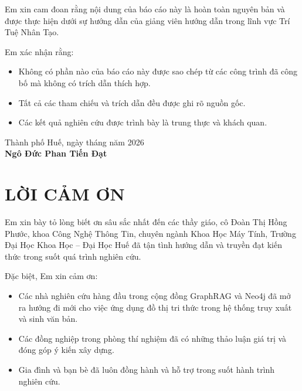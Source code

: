 \documentclass[12pt,a4paper]{report}
\theoremstyle{plain}
\theoremstyle{definition}
\begin{document}
	\vspace{1cm}
	
	Em xin cam đoan rằng nội dung của báo cáo này là hoàn toàn nguyên bản và được
	thực hiện dưới sự hướng dẫn của giảng viên hướng dẫn trong lĩnh vực Trí Tuệ Nhân Tạo.
	
	Em xác nhận rằng:
	\begin{itemize}
		\item Không có phần nào của báo cáo này được sao chép từ các công trình đã công
		bố mà không có trích dẫn thích hợp.
		\item Tất cả các tham chiếu và trích dẫn đều được ghi rõ nguồn gốc.
		\item Các kết quả nghiên cứu được trình bày là trung thực và khách quan.
	\end{itemize}
	
	\vspace{2cm}
	
	\begin{flushright}
		Thành phố Huế, ngày \quad tháng \quad năm 2026\\[1cm]
		\textbf{Ngô Đức Phan Tiến Đạt}
	\end{flushright}
	
	\clearpage
	
	
	\thispagestyle{empty}
	\vspace*{3cm}
	
	\section*{LỜI CẢM ƠN}
	
	\vspace{1cm}
	
	Em xin bày tỏ lòng biết ơn sâu sắc nhất đến các thầy giáo, cô Đoàn Thị Hồng
	Phước, khoa Công Nghệ Thông Tin, chuyên ngành Khoa Học Máy Tính, Trường Đại
	Học Khoa Học -- Đại Học Huế đã tận tình hướng dẫn và truyền đạt kiến thức
	trong suốt quá trình nghiên cứu.
	
	Đặc biệt, Em xin cảm ơn:
	\begin{itemize}
		\item Các nhà nghiên cứu hàng đầu trong cộng đồng GraphRAG và Neo4j đã mở ra
		hướng đi mới cho việc ứng dụng đồ thị tri thức trong hệ thống truy xuất
		và sinh văn bản.
		\item Các đồng nghiệp trong phòng thí nghiệm đã có những thảo luận giá trị
		và đóng góp ý kiến xây dựng.
		\item Gia đình và bạn bè đã luôn đồng hành và hỗ trợ trong suốt hành trình
		nghiên cứu.
	\end{itemize}
	
\end{document}
